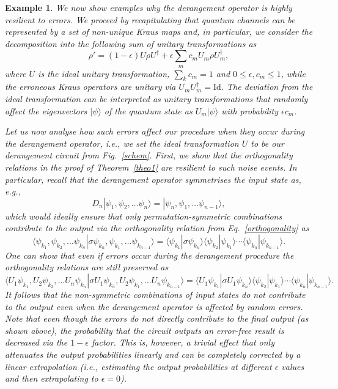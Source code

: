 \documentclass[aps,prx,showpacs,twocolumn,reprint]{revtex4-2}
\newtheorem{example}{Example}
\newcommand{\perm}{D_n}
\begin{document}
{\begin{example}\label{error_example}
	\normalfont
	We now show examples why the derangement operator is highly resilient to errors.
	We proceed by recapitulating that quantum channels can be represented by a set of
	non-unique Kraus maps and, in particular, we consider the decomposition into the following sum
	of unitary transformations as
	\begin{equation*}
	\rho' = (1-\epsilon) U \rho U^\dagger +\epsilon \sum_{m} c_m U_m \rho U^\dagger_m,
	\end{equation*}
	where $U$ is the ideal unitary transformation, $\sum_{k} c_m = 1$ and $ 0 \leq \epsilon, c_m \leq 1$,
	while  the erroneous Kraus operators
	are unitary via $U_m  U^\dagger_m = \mathrm{Id}$.
	The deviation from the ideal transformation can be interpreted as unitary transformations
	that randomly affect the eigenvectors $|\psi\rangle$ of the
	quantum state as $U_m |\psi\rangle$ with probability
	$\epsilon c_m$.
	
	Let us now analyse how such errors affect our procedure when they occur 
	during the derangement operator, i.e., we set the ideal transformation $U$ to be our derangement circuit from Fig.~\ref{schem}.
	First, we show that the orthogonality
	relations in the proof of Theorem~\ref{theo1} are resilient to such noise events.
	In particular, recall that the derangement operator symmetrises the input state
	as, e.g.,
	$$  \perm | \psi_1 , \psi_2 , \dots \psi_n \rangle = |\psi_n , \psi_1  , \dots \psi_{n-1}\rangle,$$
	which would ideally ensure that only permutation-symmetric combinations contribute to the
	output via the orthogonality relation from Eq.~\eqref{orthogonality} as
	\begin{equation*} 
	\langle \psi_{k_1}, \psi_{k_2},  \dots \psi_{k_n}	| \sigma \psi_{k_n}, \psi_{k_1},  \dots \psi_{k_{n-1}} \rangle
	=\langle\psi_{k_1} |\sigma \psi_{k_n} \rangle \langle  \psi_{k_2} | \psi_{k_1} \rangle \cdots \langle \psi_{k_n} | \psi_{k_{n-1}} \rangle.
	\end{equation*}
	One can show that even if errors occur during the derangement procedure
	the orthogonality relations are still preserved as
	\begin{equation*} 
	\langle U_{1} \psi_{k_1}, U_{2} \psi_{k_2},  \dots U_{n} \psi_{k_n}	| \sigma U_{1} \psi_{k_n}, U_2 \psi_{k_1},  \dots U_n \psi_{k_{n-1}} \rangle
	=\langle U_{1} \psi_{k_1} |\sigma U_{1} \psi_{k_n} \rangle \langle  \psi_{k_2} | \psi_{k_1} \rangle \cdots \langle \psi_{k_n} | \psi_{k_{n-1}} \rangle.
	\end{equation*}
	It follows that the non-symmetric combinations of input states do
	not contribute to the output even when the derangement operator is
	affected by random errors. Note that even though the errors do not directly contribute to
	the final output (as shown above), the probability that the circuit outputs an error-free result
	is decreased via the $1-\epsilon$ factor. This is, however, a trivial effect that only attenuates the output
	probabilities linearly and can be completely corrected by a linear extrapolation (i.e., estimating
	the output probabilities at different $\epsilon$ values and then extrapolating to $\epsilon = 0$).
	

\end{example}}
\end{document}
